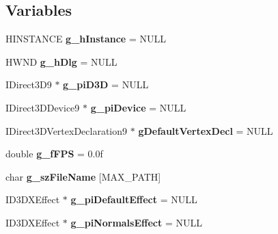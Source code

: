 \subsection*{Variables}
\begin{DoxyCompactItemize}
\item 
\hypertarget{namespace_assimp_view_a5c7a8e0feb726227e47c854b431630c8}{H\+I\+N\+S\+T\+A\+N\+C\+E {\bfseries g\+\_\+h\+Instance} = N\+U\+L\+L}\label{namespace_assimp_view_a5c7a8e0feb726227e47c854b431630c8}

\item 
\hypertarget{namespace_assimp_view_a3dd7371be4095d34779604c78ae69039}{H\+W\+N\+D {\bfseries g\+\_\+h\+Dlg} = N\+U\+L\+L}\label{namespace_assimp_view_a3dd7371be4095d34779604c78ae69039}

\item 
\hypertarget{namespace_assimp_view_a7e22feb36d24ed2390cb6f9d287079c8}{I\+Direct3\+D9 $\ast$ {\bfseries g\+\_\+pi\+D3\+D} = N\+U\+L\+L}\label{namespace_assimp_view_a7e22feb36d24ed2390cb6f9d287079c8}

\item 
\hypertarget{namespace_assimp_view_a5577108758420bd4e083813c149063bc}{I\+Direct3\+D\+Device9 $\ast$ {\bfseries g\+\_\+pi\+Device} = N\+U\+L\+L}\label{namespace_assimp_view_a5577108758420bd4e083813c149063bc}

\item 
\hypertarget{namespace_assimp_view_a8d75cb3c8e13a69e9c58d9529d517f61}{I\+Direct3\+D\+Vertex\+Declaration9 $\ast$ {\bfseries g\+Default\+Vertex\+Decl} = N\+U\+L\+L}\label{namespace_assimp_view_a8d75cb3c8e13a69e9c58d9529d517f61}

\item 
\hypertarget{namespace_assimp_view_ad10e728d01222a3368ca06f24b364486}{double {\bfseries g\+\_\+f\+F\+P\+S} = 0.\+0f}\label{namespace_assimp_view_ad10e728d01222a3368ca06f24b364486}

\item 
\hypertarget{namespace_assimp_view_a3b918638d3d75db928cd695adead7f83}{char {\bfseries g\+\_\+sz\+File\+Name} \mbox{[}M\+A\+X\+\_\+\+P\+A\+T\+H\mbox{]}}\label{namespace_assimp_view_a3b918638d3d75db928cd695adead7f83}

\item 
\hypertarget{namespace_assimp_view_a5fd9204dcef21cb64b84450edcc16a3c}{I\+D3\+D\+X\+Effect $\ast$ {\bfseries g\+\_\+pi\+Default\+Effect} = N\+U\+L\+L}\label{namespace_assimp_view_a5fd9204dcef21cb64b84450edcc16a3c}

\item 
\hypertarget{namespace_assimp_view_ae886e0b5f96dd4504eb597c9a994dd53}{I\+D3\+D\+X\+Effect $\ast$ {\bfseries g\+\_\+pi\+Normals\+Effect} = N\+U\+L\+L}\label{namespace_assimp_view_ae886e0b5f96dd4504eb597c9a994dd53}


\end{DoxyCompactItemize}
